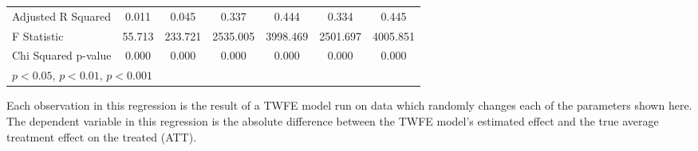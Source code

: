 \begin{landscape}
\begin{table}[htbp]
{\begin{tabular}{l*{6}{c}}
Adjusted R Squared  &       0.011         &       0.045         &       0.337         &       0.444         &       0.334         &       0.445         \\
F Statistic         &      55.713         &     233.721         &    2535.005         &    3998.469         &    2501.697         &    4005.851         \\
Chi Squared p-value &       0.000         &       0.000         &       0.000         &       0.000         &       0.000         &       0.000         \\
\hline\hline
\multicolumn{7}{l}{\footnotesize \sym{*} \(p<0.05\), \sym{**} \(p<0.01\), \sym{***} \(p<0.001\)}\\
\end{tabular}
}
\footnotesize  
\vspace{5mm}
    \footnotesize \begin{singlespace*}
        Each observation in this regression is the result of a TWFE model run on data which randomly changes each of the parameters shown here. The dependent variable in this regression is the absolute difference between the TWFE model's estimated effect and the true average treatment effect on the treated (ATT).
    \end{singlespace*}
\end{table}
\end{landscape}